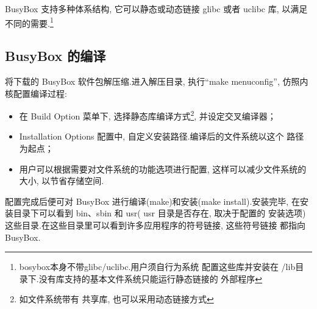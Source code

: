 	BusyBox 支持多种体系结构, 它可以静态或动态链接 glibc 或者 uclibc 库, 
以满足不同的需要.\footnote{bosybox本身不带glibc/uclibc.用户须自行为系统
配置这些库并安装在 /lib目录下.没有库支持的基本文件系统只能运行静态链接的
外部程序}

\subsection{BusyBox 的编译}
	将下载的 BusyBox 软件包解压缩.进入解压目录, 执行``make menuconfig'', 
仿照内核配置编译过程:
\begin{itemize}\itemsep=-3pt
  \item 在 Build Option 菜单下, 选择静态库编译方式\footnote{如文件系统带有
		共享库, 也可以采用动态链接方式}, 并设定交叉编译器；
  \item Installation Options 配置中, 自定义安装路径.编译后的文件系统以这个
		路径为起点；
  \item 用户可以根据需要对文件系统的功能选项进行配置, 这样可以减少文件系统的
		大小, 以节省存储空间.
\end{itemize}
	配置完成后便可对 BusyBox 进行编译(make)和安装(make install).安装完毕, 
在安装目录下可以看到 bin、sbin 和 usr( usr 目录是否存在, 取决于配置的
安装选项)这些目录.在这些目录里可以看到许多应用程序的符号链接, 这些符号链接
都指向 BusyBox.

